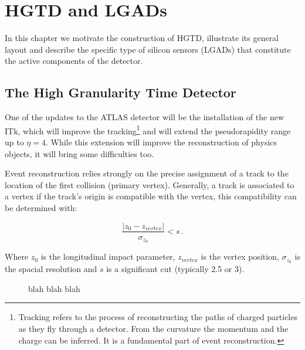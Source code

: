 \chapter{HGTD and LGADs}\label{chap:HGTD_LGADs}

In this chapter we motivate the construction of HGTD, illustrate its general layout and describe the specific type of silicon sensors (LGADs) that constitute the active components of the detector.

\section{The High Granularity Time Detector}\label{sec:HGTD}
One of the updates to the ATLAS detector will be the installation of the new ITk, which will improve the tracking\footnote{Tracking refers to the process of reconstructing the paths of charged particles as they fly through a detector. From the curvature the momentum and the charge can be inferred. It is a fundamental part of event reconstruction.} and will extend the pseudorapidity range up to $\eta=4$. While this extension will improve the reconstruction of physics objects, it will bring some difficulties too. 

Event reconstruction relies strongly on the precise assignment of a track to the location of the first collision (primary vertex).%
Generally, a track is associated to a vertex if the track's origin is compatible with the vertex, this compatibility can be determined with:

\begin{equation}\label{eq:compatibility_vertex}
    \frac{\left|z_0 - z_{vertex}\right|}{\sigma_{z_0}} < s \,.
\end{equation}
 
Where $z_0$ is the longitudinal impact parameter, $z_{vertex}$ is the vertex position, $\sigma_{z_0}$ is the spacial resolution and $s$ is a significant cut (typically 2.5 or 3)\cite{cernTechnicalDesign}. 

\begin{figure}[!ht]
    \centering
    \hfill
    \centering
    \caption{blah blah blah}
\end{figure}

